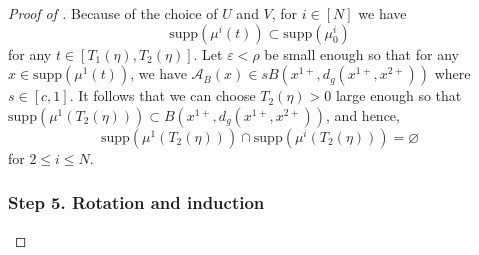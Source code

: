 \documentclass[a4paper,11pt]{article}
\theoremstyle{plain}
\newcommand{\supp}{\mathrm{supp}}
\newcommand{\bV}{\bm{\mathit{V}}}
\newcommand{\bB}{\bm{\mathit{B}}}
\newcommand{\bU}{\bm{\mathit{U}}}
\renewcommand{\leq}{\leqslant}
\numberwithin{equation}{section}
\begin{document}
\begin{proof}[Proof of ]
Because of the choice of $\bU$ and $\bV$, for $i\in[N]$ we have
\begin{equation*}
    \supp\left(\mu^i(t)\right)\subset \supp\left(\mu^i_0\right)
\end{equation*}
for any $t\in[T_1(\eta), T_2(\eta)]$. Let $\varepsilon<\rho$ be small enough so that for any $x\in\supp(\mu^1(t))$, we have
$\mathscr{A}_{\bB}(x)\in sB(x^{1+},d_g(x^{1+},x^{2+})) $ where $s\in[c,1]$. It follows that we can choose $T_2(\eta)>0$ large enough so that $\supp (\mu^1(T_2(\eta)))\subset B(x^{1+},d_g(x^{1+},x^{2+}))$, and hence, 
\begin{equation*}
    \supp\left(\mu^1(T_2(\eta))\right) \cap \supp\left(\mu^i(T_2(\eta))\right)=\varnothing
\end{equation*}
for $2\leq i\leq N$.

\subsubsection*{Step 5. Rotation and induction}


\end{proof}
\end{document}

